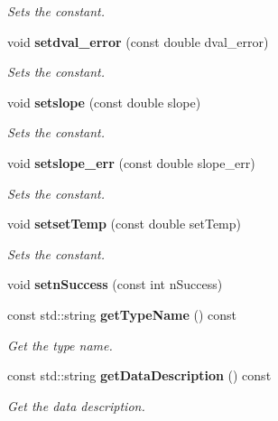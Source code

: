\begin{DoxyCompactItemize}
\begin{DoxyCompactList}\small\item\em Sets the constant. \end{DoxyCompactList}\item 
void {\bf setdval\-\_\-error} (const double dval\-\_\-error)\label{classCALICE_1_1ScECALGainfit_a4b533131ebc7ceb36ffff0587a352fa3}

\begin{DoxyCompactList}\small\item\em Sets the constant. \end{DoxyCompactList}\item 
void {\bf setslope} (const double slope)\label{classCALICE_1_1ScECALGainfit_a2e4662c5ac0958537d84277ec4415a35}

\begin{DoxyCompactList}\small\item\em Sets the constant. \end{DoxyCompactList}\item 
void {\bf setslope\-\_\-err} (const double slope\-\_\-err)\label{classCALICE_1_1ScECALGainfit_a736bb2b1b36100819166b95bca2a1d2b}

\begin{DoxyCompactList}\small\item\em Sets the constant. \end{DoxyCompactList}\item 
void {\bf setset\-Temp} (const double set\-Temp)\label{classCALICE_1_1ScECALGainfit_a31a36742c735718fdc4a8d641e2d604e}

\begin{DoxyCompactList}\small\item\em Sets the constant. \end{DoxyCompactList}\item 
void {\bfseries setn\-Success} (const int n\-Success)\label{classCALICE_1_1ScECALGainfit_a1bb85cd01b6488edc32273c559fe785b}

\item 
const std\-::string {\bf get\-Type\-Name} () const 
\begin{DoxyCompactList}\small\item\em Get the type name. \end{DoxyCompactList}\item 
const std\-::string {\bf get\-Data\-Description} () const 
\begin{DoxyCompactList}\small\item\em Get the data description. \end{DoxyCompactList}\end{DoxyCompactItemize}


